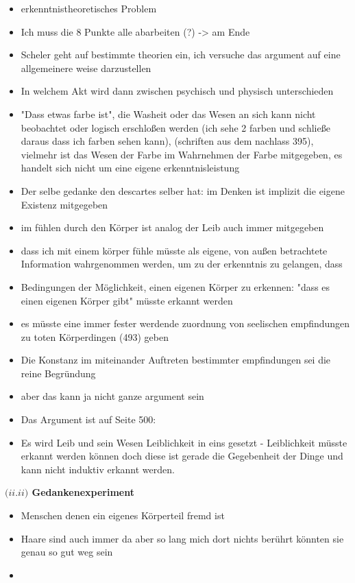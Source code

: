 \documentclass[a4paper, 12pt]{article}
\begin{document}
\begin{onehalfspace}
\begin{itemize}
  \item erkenntnistheoretisches Problem
  \item Ich muss die 8 Punkte alle abarbeiten (?) -> am Ende
  \item Scheler geht auf bestimmte theorien ein, ich versuche das argument auf eine allgemeinere weise darzustellen
  \item In welchem Akt wird dann zwischen psychisch und physisch unterschieden
  \item "Dass etwas farbe ist", die Washeit oder das Wesen an sich kann nicht beobachtet oder logisch erschloßen werden (ich sehe 2 farben und schließe daraus dass ich farben sehen kann), (schriften aus dem nachlass 395), vielmehr ist das Wesen der Farbe im Wahrnehmen der Farbe mitgegeben, es handelt sich nicht um eine eigene erkenntnisleistung
  \item Der selbe gedanke den descartes selber hat: im Denken ist implizit die eigene Existenz mitgegeben
  \item im fühlen durch den Körper ist analog der Leib auch immer mitgegeben
  \item dass ich mit einem körper fühle müsste als eigene, von außen betrachtete Information wahrgenommen werden, um zu der erkenntnis zu gelangen, dass 
  \item Bedingungen der Möglichkeit, einen eigenen Körper zu erkennen: "dass es einen eigenen Körper gibt" müsste erkannt werden
  \item es müsste eine immer fester werdende zuordnung von seelischen empfindungen zu toten Körperdingen (493) geben
  \item Die Konstanz im miteinander Auftreten bestimmter empfindungen sei die reine Begründung
  \item aber das kann ja nicht ganze argument sein
  \item Das Argument ist auf Seite 500:
  \item Es wird Leib und sein Wesen Leiblichkeit in eins gesetzt - Leiblichkeit müsste erkannt werden können doch diese ist gerade die Gegebenheit der Dinge und kann nicht induktiv erkannt werden.
\end{itemize}

\vspace{3mm}
\noindent\textbf{$(ii.$\footnotesize$ii$\normalsize$)$ Gedankenexperiment}

\begin{itemize}
  \item Menschen denen ein eigenes Körperteil fremd ist
  \item Haare sind auch immer da aber so lang mich dort nichts berührt könnten sie genau so gut weg sein
  \item 
\end{itemize}



\end{onehalfspace}
\end{document}
